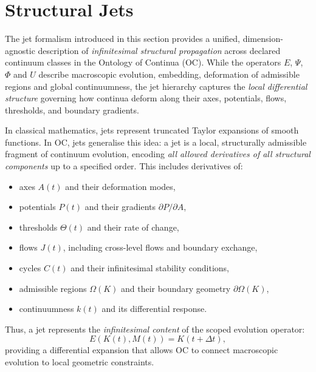
\section{Structural Jets}
\label{sec:jets-master}

The jet formalism introduced in this section provides a unified,
dimension-agnostic description of \emph{infinitesimal structural
propagation} across declared continuum classes in the Ontology of Continua (OC).
While the operators $E$, $\Psi$, $\Phi$ and $U$ describe macroscopic
evolution, embedding, deformation of admissible regions and global
continuumness, the jet hierarchy captures the \emph{local differential
structure} governing how continua deform along their axes, potentials,
flows, thresholds, and boundary gradients.

\medskip

In classical mathematics, jets represent truncated Taylor expansions of
smooth functions. In OC, jets generalise this idea: a jet is a local,
structurally admissible fragment of continuum evolution, encoding
\emph{all allowed derivatives of all structural components} up to a
specified order. This includes derivatives of:

\begin{itemize}
    \item axes $A(t)$ and their deformation modes,
    \item potentials $P(t)$ and their gradients $\partial P / \partial A$,
    \item thresholds $\Theta(t)$ and their rate of change,
    \item flows $J(t)$, including cross-level flows and boundary exchange,
    \item cycles $C(t)$ and their infinitesimal stability conditions,
    \item admissible regions $\Omega(K)$ and their boundary geometry $\partial\Omega(K)$,
    \item continuumness $k(t)$ and its differential response.
\end{itemize}

Thus, a jet represents the \emph{infinitesimal content} of the scoped
evolution operator:
\[
E(K(t), M(t)) = K(t+\Delta t),
\]
providing a differential expansion that allows OC to connect macroscopic
evolution to local geometric constraints.



